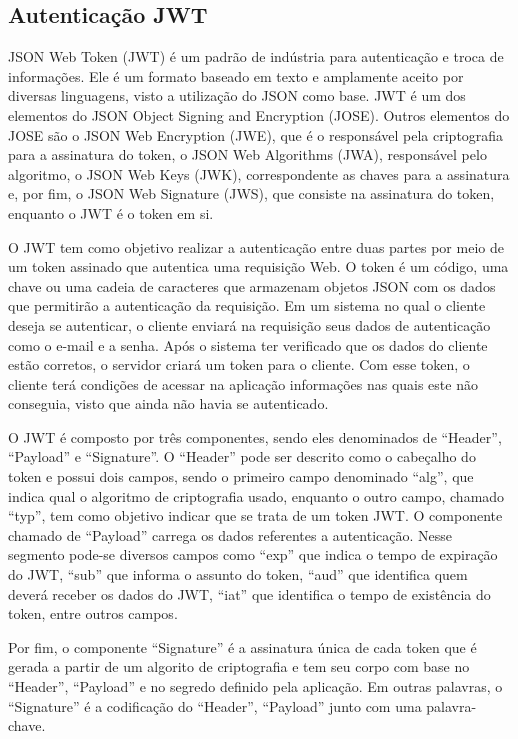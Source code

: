 \documentclass[
    12pt,               %
    openright,          %
    oneside,
    a4paper,            %
    BIBLATEX,           %
    TODO,               %
    english,            %
    brazil              %
    ]{ifsp-spo-inf-ctds}
\begin{document}
        \subsection{Autenticação JWT}
    
            JSON Web Token (JWT) é um padrão de indústria para autenticação e troca de informações. Ele é um formato baseado em texto e amplamente aceito por diversas linguagens, visto a utilização do JSON como base. JWT é um dos elementos do JSON Object Signing and Encryption (JOSE). Outros elementos do JOSE são o JSON Web Encryption (JWE), que é o responsável pela criptografia para a assinatura do token, o JSON Web Algorithms (JWA), responsável pelo algoritmo, o JSON Web Keys (JWK), correspondente as chaves para a assinatura e, por fim, o JSON Web Signature (JWS), que consiste na assinatura do token, enquanto o JWT é o token em si.
            
            O JWT tem como objetivo realizar a autenticação entre duas partes por meio de um token assinado que autentica uma requisição Web. O token é um código, uma chave ou uma cadeia de caracteres que armazenam objetos JSON com os dados que permitirão a autenticação da requisição.
            Em um sistema no qual o cliente deseja se autenticar, o cliente enviará na requisição seus dados de autenticação como o e-mail e a senha. Após o sistema ter verificado que os dados do cliente estão corretos, o servidor criará um token para o cliente. Com esse token, o cliente terá condições de acessar na aplicação informações nas quais este não conseguia, visto que ainda não havia se autenticado. 
            
            O JWT é composto por três componentes, sendo eles denominados de “Header”, “Payload” e “Signature”. O “Header” pode ser descrito como o cabeçalho do token e possui dois campos, sendo o primeiro campo denominado “alg”, que indica qual o algoritmo de criptografia usado, enquanto o outro campo, chamado “typ”, tem como objetivo indicar que se trata de um token JWT. 
            O componente chamado de “Payload” carrega os dados referentes a autenticação. Nesse segmento pode-se diversos campos como “exp” que indica o tempo de expiração do JWT, “sub” que informa o assunto do token, “aud” que identifica quem deverá receber os dados do JWT, “iat” que identifica o tempo de existência do token, entre outros campos.
            
            Por fim, o componente “Signature” é a assinatura única de cada token que é gerada a partir de um algorito de criptografia e tem seu corpo com base no “Header”, “Payload” e no segredo definido pela aplicação. Em outras palavras, o “Signature” é a codificação do “Header”, “Payload” junto com uma palavra-chave.
            
\end{document}
